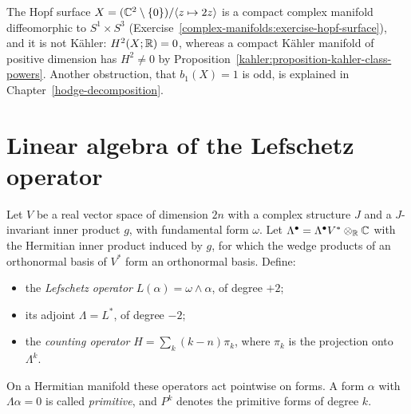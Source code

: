 \begin{counterexample}\label{kahler:counterexample-hopf}
The Hopf surface $X = (\mathbb{C}^2 \setminus \{0\})/\langle z \mapsto 2z\rangle$ is a compact complex manifold diffeomorphic to $S^1 \times S^3$
(Exercise~\ref{complex-manifolds:exercise-hopf-surface}), and it is not K\"ahler: $H^2(X; \mathbb{R}) = 0$, whereas a compact K\"ahler manifold of positive
dimension has $H^2 \neq 0$ by Proposition~\ref{kahler:proposition-kahler-class-powers}. Another obstruction, that $b_1(X) = 1$ is odd, is
explained in Chapter~\ref{hodge-decomposition}.
\end{counterexample}

\section{Linear algebra of the Lefschetz operator}\label{kahler:section-lefschetz-linear-algebra}

\begin{definition}\label{kahler:definition-lefschetz-operators}
Let $V$ be a real vector space of dimension $2n$ with a complex structure $J$ and a $J$-invariant inner product $g$, with fundamental form
$\omega$. Let $\Lambda^\bullet = \Lambda^\bullet V^* \otimes_{\mathbb{R}} \mathbb{C}$ with the Hermitian inner product induced by $g$, for which the wedge
products of an orthonormal basis of $V^*$ form an orthonormal basis. Define:
\begin{itemize}
\item the \emph{Lefschetz operator} $L(\alpha) = \omega \wedge \alpha$, of degree $+2$;
\item its adjoint $\Lambda = L^*$, of degree $-2$;
\item the \emph{counting operator} $H = \sum_k(k - n)\pi_k$, where $\pi_k$ is the projection onto $\Lambda^k$.
\end{itemize}
On a Hermitian manifold these operators act pointwise on forms. A form $\alpha$ with $\Lambda\alpha = 0$ is called \emph{primitive}, and
$P^k$ denotes the primitive forms of degree $k$.
\end{definition}

